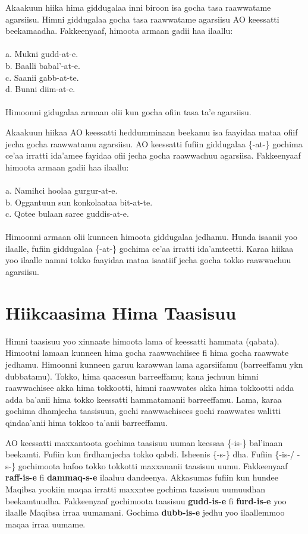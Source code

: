 \documentclass[11pt,b5paper]{book}
\begin{document}
Akaakuun hiika hima giddugalaa inni biroon isa gocha tasa raawwatame agarsiisu. Himni giddugalaa gocha tasa raawwatame agarsiisu AO keessatti beekamaadha. Fakkeenyaaf, himoota armaan gadii haa ilaallu:\\
\\
a. Mukni gudd-at-e.\\
b. Baalli babal'-at-e.\\
c. Saanii gabb-at-te.\\
d. Bunni diim-at-e.\\
\\
Himoonni gidugalaa armaan olii kun gocha ofiin tasa ta'e agarsiisu. 

Akaakuun hiikaa AO keessatti heddumminaan beekamu isa faayidaa mataa ofiif jecha gocha raawwatamu agarsiisu. AO keessatti fufiin giddugalaa \{-at-\} gochima ce'aa irratti ida'amee fayidaa ofii jecha gocha raawwachuu agarsiisa. Fakkeenyaaf himoota armaan gadii haa ilaallu:\\
\\
a. Namihci hoolaa gurgur-at-e.\\
b. Oggantuun sun konkolaataa bit-at-te.\\
c. Qotee bulaan saree guddis-at-e.\\
\\
Himoonni armaan olii kunneen himoota giddugalaa jedhamu. Hunda isaanii yoo ilaalle, fufiin giddugalaa \{-at-\} gochima ce'aa irratti ida'amteetti. Karaa hiikaa yoo ilaalle namni tokko faayidaa mataa isaatiif jecha gocha tokko raawwachuu agarsiisu.

\section{Hiikcaasima Hima Taasisuu}

Himni taasisuu yoo xinnaate himoota lama of keessatti hammata (qabata). Himootni lamaan kunneen hima gocha raawwachiisee fi hima gocha raawwate jedhamu. Himoonni kunneen garuu karawwan lama agarsiifamu (barreeffamu ykn dubbatamu). Tokko, hima qaacesun barreeffamu; kana jechuun himni raawwachisee akka hima tokkootti, himni raawwates akka hima tokkootti adda adda ba’anii hima tokko keessatti hammatamanii barreeffamu. Lama, karaa gochima dhamjecha taasisuun, gochi raawwachisees gochi raawwates walitti qindaa’anii hima tokkoo ta’anii barreeffamu. 

AO keessatti maxxantoota gochima taasisuu uuman keessaa \{-is-\} bal’inaan beekamti. Fufiin kun firdhamjecha tokko qabdi. Isheenis \{-s-\} dha. Fufiin \{-is-/ -s-\} gochimoota hafoo tokko
tokkotti maxxananii taasisuu uumu. Fakkeenyaaf \textbf{raff-is-e} fi \textbf{dammaq-s-e} ilaaluu dandeenya. Akkasumas fufiin kun hundee Maqibsa yookiin maqaa irratti maxxntee gochima taasisuu uumuudhan beekamtuudha. Fakkeenyaaf gochimoota taasisuu \textbf{gudd-is-e} fi \textbf{furd-is-e} yoo ilaalle Maqibsa irraa uumamani. Gochima \textbf{dubb-is-e} jedhu yoo ilaallemmoo maqaa irraa uumame. 
\end{document}
